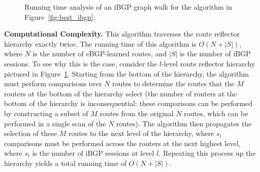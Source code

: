 \begin{figure}[t]
\begin{center}
\begin{psfrags}
\hspace{0.3in}
\end{psfrags}
\end{center}
\caption[Running time analysis of an iBGP graph walk.]{Running time
  analysis of an iBGP graph walk for the algorithm 
  in Figure~\ref{fig:best_ibgp}.}
\label{fig:rr_hierarchy}
\end{figure}


\textbf{Computational Complexity.}  This algorithm traverses the route
reflector hierarchy exactly twice.  The running time of this algorithm
is $O(N + |S|)$, where $N$ is the number of eBGP-learned routes, and
$|S|$ is the number of iBGP sessions.  To see why this is the case,
consider the $l$-level route reflector hierarchy pictured in
Figure~\ref{fig:rr_hierarchy}.  Starting from the bottom of the
hierarchy, the algorithm must perform comparisons over $N$ routes to
determine the routes that the $M$ routers at the bottom of the hierarchy
select (the number of routers at the bottom of the hierarchy is
inconsequential: these comparisons can be performed by constructing a
subset of $M$ routes from the original $N$ routes, which can be
performed in a single scan of the $N$ routes).  The algorithm then
propagates the selection of these $M$ routes to the next level of the
hierarchy, where $s_l$ comparisons must be performed across the routers
at the next highest level, where $s_l$ is the number of iBGP sessions at
level $l$.  Repeating this process up the hierarchy yields a total
running time of $O(N+|S|)$.

